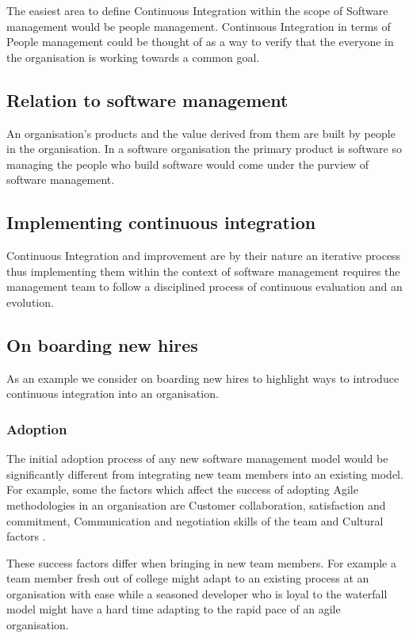 \documentclass[12pt,conference]{IEEEtran}
\begin{document}
The easiest area to define Continuous Integration within the scope of Software management would be people management. Continuous Integration in terms of People management could be thought of as a way to verify that the everyone in the organisation is working towards a common goal.


\subsection*{Relation to software management}

An organisation's products and the value derived from them are built by people in the organisation. In a software organisation the primary product is software so managing the people who build software would come under the purview of software management. 

\subsection*{Implementing continuous integration}

Continuous Integration and improvement are by their nature an iterative process thus implementing them within the context of software management requires the management team to follow a disciplined process of continuous evaluation and an evolution.

\subsection*{On boarding new hires}

As an example we consider on boarding new hires to highlight ways to introduce continuous integration into an organisation.

\subsubsection*{Adoption}

The initial adoption process of any new software management model would be significantly different from integrating new team members into an existing model. For example, some the factors which affect the success of adopting Agile methodologies in an organisation are 
Customer collaboration, satisfaction and commitment, Communication and negotiation skills of the team and Cultural factors \cite{misra_identifying_2009}.

These success factors differ when bringing in new team members. For example a team member fresh out of college might adapt to an existing process at an organisation with ease while a seasoned developer who is loyal to the waterfall model might have a hard time adapting to the rapid pace of an agile organisation. 
\end{document}

